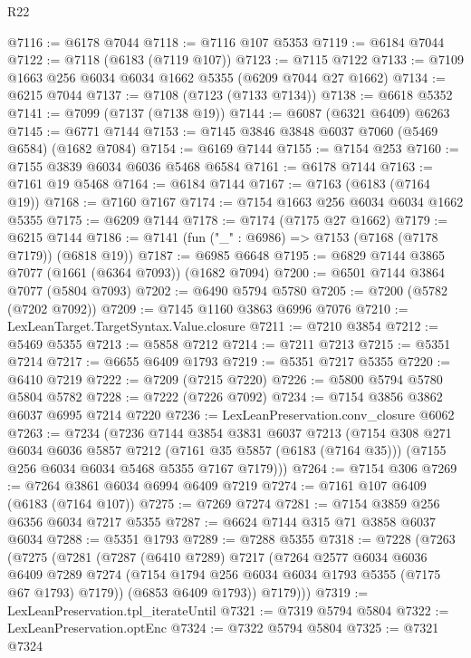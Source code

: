 \begin{lexlean}{R22}
\begin{coremodule}
@7116 := @6178 @7044
@7118 := @7116 @107 @5353
@7119 := @6184 @7044
@7122 := @7118 (@6183 (@7119 @107))
@7123 := @7115 @7122
@7133 := @7109 @1663 @256 @6034 @6034 @1662 @5355 (@6209 @7044 @27 @1662)
@7134 := @6215 @7044
@7137 := @7108 (@7123 (@7133 @7134))
@7138 := @6618 @5352
@7141 := @7099 (@7137 (@7138 @19))
@7144 := @6087 (@6321 @6409) @6263
@7145 := @6771 @7144
@7153 := @7145 @3846 @3848 @6037 @7060 (@5469 @6584) (@1682 @7084)
@7154 := @6169 @7144
@7155 := @7154 @253
@7160 := @7155 @3839 @6034 @6036 @5468 @6584
@7161 := @6178 @7144
@7163 := @7161 @19 @5468
@7164 := @6184 @7144
@7167 := @7163 (@6183 (@7164 @19))
@7168 := @7160 @7167
@7174 := @7154 @1663 @256 @6034 @6034 @1662 @5355
@7175 := @6209 @7144
@7178 := @7174 (@7175 @27 @1662)
@7179 := @6215 @7144
@7186 := @7141 (fun ("_" : @6986) => @7153 (@7168 (@7178 @7179)) (@6818 @19))
@7187 := @6985 @6648
@7195 := @6829 @7144 @3865 @7077 (@1661 (@6364 @7093)) (@1682 @7094)
@7200 := @6501 @7144 @3864 @7077 (@5804 @7093)
@7202 := @6490 @5794 @5780
@7205 := @7200 (@5782 (@7202 @7092))
@7209 := @7145 @1160 @3863 @6996 @7076
@7210 := LexLeanTarget.TargetSyntax.Value.closure
@7211 := @7210 @3854
@7212 := @5469 @5355
@7213 := @5858 @7212
@7214 := @7211 @7213
@7215 := @5351 @7214
@7217 := @6655 @6409 @1793
@7219 := @5351 @7217 @5355
@7220 := @6410 @7219
@7222 := @7209 (@7215 @7220)
@7226 := @5800 @5794 @5780 @5804 @5782
@7228 := @7222 (@7226 @7092)
@7234 := @7154 @3856 @3862 @6037 @6995 @7214 @7220
@7236 := LexLeanPreservation.conv_closure @6062
@7263 := @7234
    (@7236
      @7144
      @3854
      @3831
      @6037
      @7213
      (@7154
        @308
        @271
        @6034
        @6036
        @5857
        @7212
        (@7161 @35 @5857 (@6183 (@7164 @35)))
        (@7155 @256 @6034 @6034 @5468 @5355 @7167 @7179)))
@7264 := @7154 @306
@7269 := @7264 @3861 @6034 @6994 @6409 @7219
@7274 := @7161 @107 @6409 (@6183 (@7164 @107))
@7275 := @7269 @7274
@7281 := @7154 @3859 @256 @6356 @6034 @7217 @5355
@7287 := @6624 @7144 @315 @71 @3858 @6037 @6034
@7288 := @5351 @1793
@7289 := @7288 @5355
@7318 := @7228
    (@7263
      (@7275
        (@7281
          (@7287
            (@6410 @7289)
            @7217
            (@7264
              @2577
              @6034
              @6036
              @6409
              @7289
              @7274
              (@7154 @1794 @256 @6034 @6034 @1793 @5355 (@7175 @67 @1793) @7179))
            (@6853 @6409 @1793))
          @7179)))
@7319 := LexLeanPreservation.tpl_iterateUntil
@7321 := @7319 @5794 @5804
@7322 := LexLeanPreservation.optEnc
@7324 := @7322 @5794 @5804
@7325 := @7321 @7324

\end{coremodule}
\end{lexlean}
